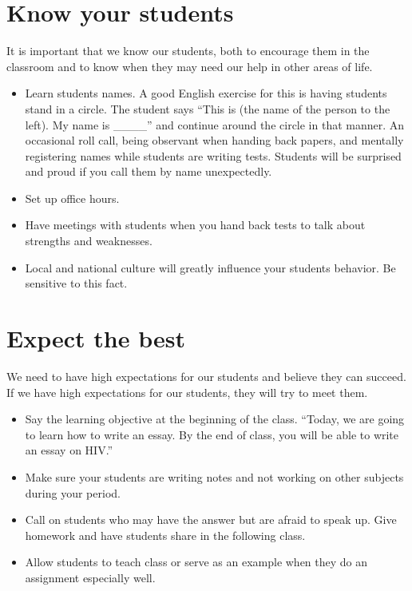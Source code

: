 \section{Know your students}
It is important  that we know our students, both to encourage them in the classroom and to know when they may need our help in other areas of life.  

\begin{itemize}
 \item Learn students names.  A good English exercise for this is having students stand in a circle.  The student says ``This is (the name of the person to the left). My name is \_\_\_\_'' and continue around the circle in that manner. An occasional roll call, being observant
when handing back papers, and mentally registering names while
students are writing tests.  Students will be surprised and proud if
you call them by name unexpectedly.
 \item Set up office hours.
 \item Have meetings with students when you hand back tests to talk about strengths and weaknesses. 
 \item Local and national culture will greatly influence your students behavior.  Be sensitive to this fact.
\end{itemize}

\section{Expect the best}
We need to have high expectations for our students and believe they can succeed.  If we have high expectations for our students, they will try to meet them. 

\begin{itemize}
 \item Say the learning objective at the beginning of the class.  ``Today, we are going to learn how to write an essay.   By the end of class, you will be able to write an essay on HIV.''
 \item Make sure your students are writing notes and not working on other subjects during your period.  
 \item Call on students who may have the answer but are afraid to speak up.  Give homework and have students share in the following class.  
 \item Allow students to teach class or serve as an example when they do an assignment especially well.
\end{itemize}

